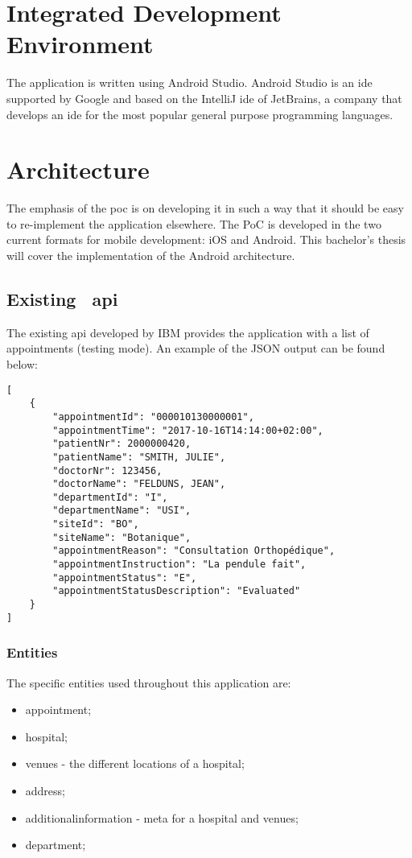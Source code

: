 \section{Integrated Development Environment}
The application is written using Android Studio. Android Studio is an \acrshort{ide} supported by Google and based on the IntelliJ \acrshort{ide} of JetBrains, a company that develops an \acrshort{ide} for the most popular general purpose programming languages.
\section{Architecture}
The emphasis of the \acrshort{poc} is on developing it in such a way that it should be easy to re-implement the application elsewhere. The PoC is developed in the two current formats for mobile development: iOS and Android. This bachelor's thesis will cover the implementation of the Android architecture.
\subsection{Existing ~\acrshort{api}}
The existing \acrshort{api} developed by IBM provides the application with a list of appointments (testing mode). An example of the JSON output can be found below:

\begin{verbatim}
[
    {
        "appointmentId": "000010130000001",
        "appointmentTime": "2017-10-16T14:14:00+02:00",
        "patientNr": 2000000420,
        "patientName": "SMITH, JULIE",
        "doctorNr": 123456,
        "doctorName": "FELDUNS, JEAN",
        "departmentId": "I",
        "departmentName": "USI",
        "siteId": "BO",
        "siteName": "Botanique",
        "appointmentReason": "Consultation Orthopédique",
        "appointmentInstruction": "La pendule fait",
        "appointmentStatus": "E",
        "appointmentStatusDescription": "Evaluated"
    }
]
\end{verbatim}			
\subsubsection{Entities}
The specific entities used throughout this application are:
\begin{itemize}
\item appointment;
\item hospital;
\item venues - the different locations of a hospital;
\item address;
\item additionalinformation - meta for a hospital and venues;
\item department;
\end{itemize}

